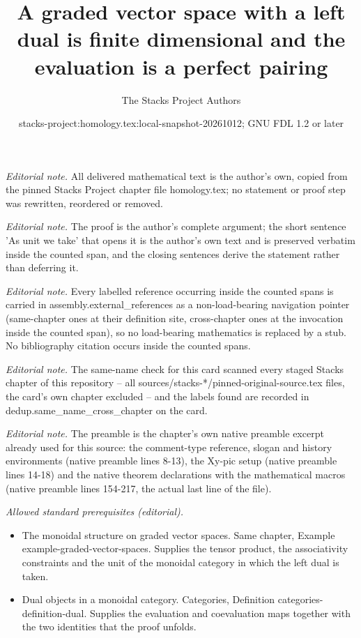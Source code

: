 \documentclass[10pt,a4paper]{amsart}
\title{A graded vector space with a left dual is finite dimensional and the evaluation is a perfect pairing}
\author{The Stacks Project Authors}
\date{stacks-project:homology.tex:local-snapshot-20261012; GNU FDL 1.2 or later}
\theoremstyle{plain}
\theoremstyle{definition}
\theoremstyle{remark}
\numberwithin{equation}{subsection}
\begin{document}
\maketitle
\noindent\textit{Editorial note.} All delivered mathematical text is the author's own, copied from the pinned Stacks Project chapter file homology.tex; no statement or proof step was rewritten, reordered or removed.\par\medskip
\noindent\textit{Editorial note.} The proof is the author's complete argument; the short sentence 'As unit we take' that opens it is the author's own text and is preserved verbatim inside the counted span, and the closing sentences derive the statement rather than deferring it.\par\medskip
\noindent\textit{Editorial note.} Every labelled reference occurring inside the counted spans is carried in assembly.external\_references as a non-load-bearing navigation pointer (same-chapter ones at their definition site, cross-chapter ones at the invocation inside the counted span), so no load-bearing mathematics is replaced by a stub. No bibliography citation occurs inside the counted spans.\par\medskip
\noindent\textit{Editorial note.} The same-name check for this card scanned every staged Stacks chapter of this repository -- all sources/stacks-*/pinned-original-source.tex files, the card's own chapter excluded -- and the labels found are recorded in dedup.same\_name\_cross\_chapter on the card.\par\medskip
\noindent\textit{Editorial note.} The preamble is the chapter's own native preamble excerpt already used for this source: the comment-type reference, slogan and history environments (native preamble lines 8-13), the Xy-pic setup (native preamble lines 14-18) and the native theorem declarations with the mathematical macros (native preamble lines 154-217, the actual last line of the file).\par\medskip
\noindent\textit{Allowed standard prerequisites (editorial).}\begin{itemize}
\item The monoidal structure on graded vector spaces. Same chapter, Example example-graded-vector-spaces. Supplies the tensor product, the associativity constraints and the unit of the monoidal category in which the left dual is taken.
\item Dual objects in a monoidal category. Categories, Definition categories-definition-dual. Supplies the evaluation and coevaluation maps together with the two identities that the proof unfolds.
\end{itemize}\medskip
\end{document}
